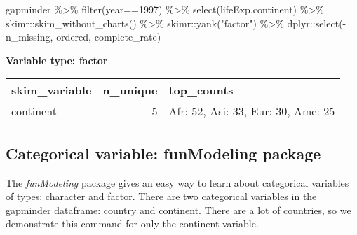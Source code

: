 \documentclass[
]{book}
\newenvironment{Shaded}{\begin{snugshade}}{\end{snugshade}}
\newcommand{\CommentTok}[1]{\textcolor[rgb]{0.56,0.35,0.01}{\textit{#1}}}
\newcommand{\DecValTok}[1]{\textcolor[rgb]{0.00,0.00,0.81}{#1}}
\newcommand{\FunctionTok}[1]{\textcolor[rgb]{0.00,0.00,0.00}{#1}}
\newcommand{\NormalTok}[1]{#1}
\newcommand{\SpecialCharTok}[1]{\textcolor[rgb]{0.00,0.00,0.00}{#1}}
\newcommand{\StringTok}[1]{\textcolor[rgb]{0.31,0.60,0.02}{#1}}
\begin{document}
\begin{Shaded}
\begin{Highlighting}[]
\NormalTok{gapminder }\SpecialCharTok{\%\textgreater{}\%} \FunctionTok{filter}\NormalTok{(year}\SpecialCharTok{==}\DecValTok{1997}\NormalTok{) }\SpecialCharTok{\%\textgreater{}\%} 
  \FunctionTok{select}\NormalTok{(lifeExp,continent) }\SpecialCharTok{\%\textgreater{}\%} 
\NormalTok{  skimr}\SpecialCharTok{::}\FunctionTok{skim\_without\_charts}\NormalTok{() }\SpecialCharTok{\%\textgreater{}\%}
\NormalTok{  skimr}\SpecialCharTok{::}\FunctionTok{yank}\NormalTok{(}\StringTok{"factor"}\NormalTok{) }\SpecialCharTok{\%\textgreater{}\%}
\NormalTok{  dplyr}\SpecialCharTok{::}\FunctionTok{select}\NormalTok{(}\SpecialCharTok{{-}}\NormalTok{n\_missing,}\SpecialCharTok{{-}}\NormalTok{ordered,}\SpecialCharTok{{-}}\NormalTok{complete\_rate)}
\end{Highlighting}
\end{Shaded}

\textbf{Variable type: factor}

\begin{tabular}{l|r|l}
\hline
skim\_variable & n\_unique & top\_counts\\
\hline
continent & 5 & Afr: 52, Asi: 33, Eur: 30, Ame: 25\\
\hline
\end{tabular}

\hypertarget{categorical-variable-funmodeling-package}{%
\subsection{Categorical variable: funModeling package}\label{categorical-variable-funmodeling-package}}

The \emph{funModeling} package gives an easy way to learn about categorical variables of types: character and factor. There are two categorical variables in the gapminder
dataframe: country and continent. There are a lot of countries, so we demonstrate
this command for only the continent variable.

\begin{Shaded}
\end{Shaded}
\end{document}
